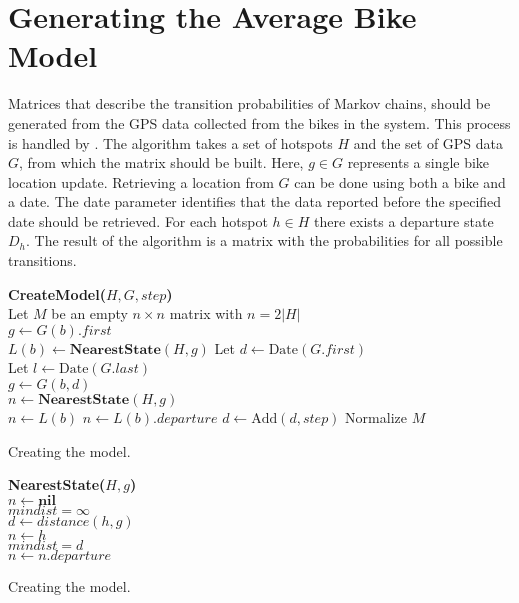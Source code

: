 \section{Generating the Average Bike Model} \label{markov:create_model}
Matrices that describe the transition probabilities of Markov chains, should be generated from the GPS data collected from the bikes in the system.
This process is handled by .
The algorithm takes a set of hotspots $H$ and the set of GPS data $G$, from which the matrix should be built.
Here, $g \in G$ represents a single bike location update.
Retrieving a location from $G$ can be done using both a bike and a date.
The date parameter identifies that the data reported before the specified date should be retrieved.
For each hotspot $h \in H$ there exists a departure state $D_h$.
The result of the algorithm is a matrix with the probabilities for all possible transitions.

\begin{algorithm}
\SetAlgoNoEnd
\textbf{CreateModel($H, G, step$)}\\
Let $M$ be an empty $n \times n$ matrix with $n = 2|H|$ \\
	{
	$g \leftarrow G(b).first$\\
	$L(b) \leftarrow \textbf{NearestState}(H, g)$
	}
Let $d \leftarrow \text{Date}(G.first)$\\
Let $l \leftarrow \text{Date}(G.last)$\\
	{
		{
		$g \leftarrow G(b, d)$\\
		$n \leftarrow \textbf{NearestState}(H, g)$\\
			{
			$n \leftarrow L(b)$
			}
			{
			$n \leftarrow L(b).departure$
			}
		}
	$d \leftarrow \text{Add}(d, step)$
	}
Normalize $M$\\
\caption{Creating the model.}
\label{markov:alg:create_model}
\end{algorithm}

\begin{algorithm}
\SetAlgoNoEnd
\textbf{NearestState($H, g$)}\\
$n \leftarrow \textbf{nil}$\\
$mindist = \infty$\\
	{
	$d \leftarrow distance(h, g)$\\
		{
		$n \leftarrow h$\\
		$mindist = d$\\
		}
	}
	{
	$n \leftarrow n.departure$
	}
\caption{Creating the model.}
\label{markov:alg:nearest}
\end{algorithm}